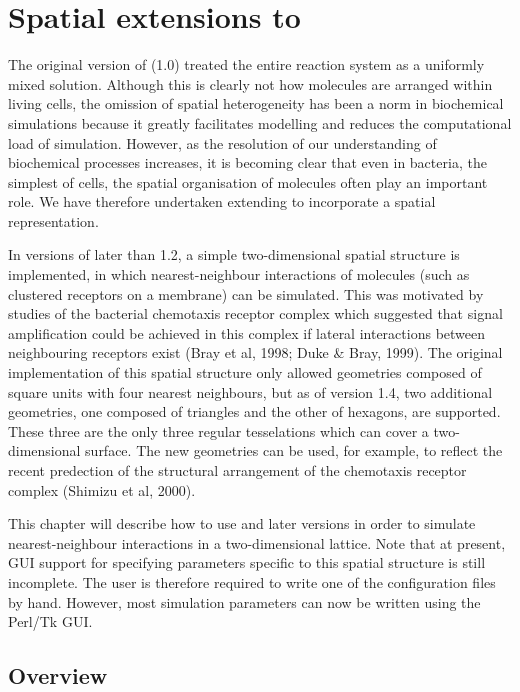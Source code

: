 \chapter{Spatial extensions to \stochsim{}}\label{spatial_extensions}

The original version of \stochsim{} (1.0) treated the entire reaction
system as a uniformly mixed solution.  Although this is clearly not
how molecules are arranged within living cells, the omission of spatial
heterogeneity has been a norm in biochemical simulations because it
greatly facilitates modelling and reduces the computational load of
simulation.  However, as the resolution of our understanding of
biochemical processes increases, it is becoming clear that even in
bacteria, the simplest of cells, the spatial organisation of molecules
often play an important role.  We have therefore undertaken extending
\stochsim{} to incorporate a spatial representation.

In versions of \stochsim{} later than 1.2, a simple two-dimensional
spatial structure is implemented, in which nearest-neighbour
interactions of molecules (such as clustered receptors on a membrane)
can be simulated.  This was motivated by studies of the bacterial
chemotaxis receptor complex which suggested that signal amplification
could be achieved in this complex if lateral interactions between
neighbouring receptors exist (Bray et al, 1998; Duke \& Bray, 1999).
The original implementation of this spatial structure only allowed
geometries composed of square units with four nearest neighbours, but
as of version 1.4, two additional geometries, one composed of
triangles and the other of hexagons, are supported.  These three are
the only three regular tesselations which can cover a two-dimensional
surface.  The new geometries can be used, for example, to reflect the
recent predection of the structural arrangement of the chemotaxis
receptor complex (Shimizu et al, 2000).

This chapter will describe how to use \stochsim{} \CURRENTVERSION{}
and later versions in order to simulate nearest-neighbour interactions
in a two-dimensional lattice.  Note that at present, GUI support for
specifying parameters specific to this spatial structure is still
incomplete.  The user is therefore required to write one of the
configuration files by hand.  However, most simulation parameters can
now be written using the Perl/Tk GUI.

\section{Overview}\label{se_overview}


